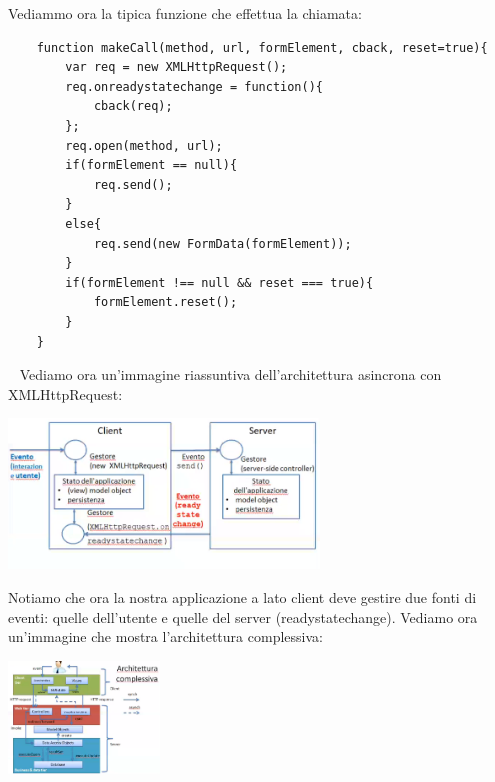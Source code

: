 Vediammo ora la tipica funzione che effettua la chiamata:
\begin{lstlisting}
    function makeCall(method, url, formElement, cback, reset=true){
        var req = new XMLHttpRequest();
        req.onreadystatechange = function(){
            cback(req);
        };
        req.open(method, url);
        if(formElement == null){
            req.send();
        }
        else{
            req.send(new FormData(formElement));
        }
        if(formElement !== null && reset === true){
            formElement.reset();
        }
    }
\end{lstlisting}
\ \newline
Vediamo ora un'immagine riassuntiva dell'architettura asincrona con XMLHttpRequest:
\begin{center}
    \includegraphics[height=4cm]{../lezione18/img1.PNG}
\end{center}
Notiamo che ora la nostra applicazione a lato client deve gestire due fonti di eventi: quelle dell'utente e quelle del server (readystatechange).\newline
Vediamo ora un'immagine che mostra l'architettura complessiva:
\begin{center}
    \includegraphics[height=3cm]{../lezione18/img2.PNG}
\end{center}